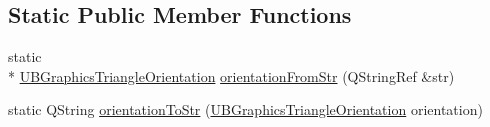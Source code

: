 \subsection*{Static Public Member Functions}
\begin{DoxyCompactItemize}
\item 
static \\*
\hyperlink{class_u_b_graphics_triangle_a2bcbf42a1d36e4d35bbad30e742a2b65}{U\-B\-Graphics\-Triangle\-Orientation} \hyperlink{class_u_b_graphics_triangle_aaaef5faa2a7ffb3ce088ee32675f2d3f}{orientation\-From\-Str} (Q\-String\-Ref \&str)
\item 
static Q\-String \hyperlink{class_u_b_graphics_triangle_a0b703ffccda42820f94297a6e25c1727}{orientation\-To\-Str} (\hyperlink{class_u_b_graphics_triangle_a2bcbf42a1d36e4d35bbad30e742a2b65}{U\-B\-Graphics\-Triangle\-Orientation} orientation)
\end{DoxyCompactItemize}
